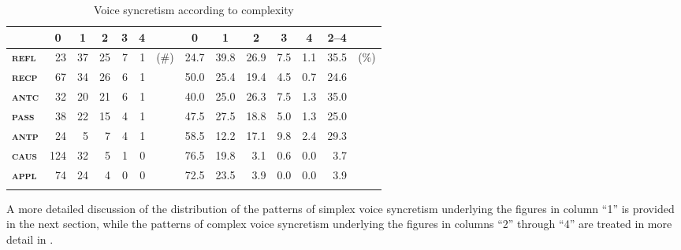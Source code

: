 \begin{table}
	\setlength{\tabcolsep}{2.7pt}
	\begin{tabularx}{.77\textwidth}{lrrrrrlrrrrrrl}
		\lsptoprule
		& \multicolumn{1}{c}{\textbf{0}} & \multicolumn{1}{c}{\textbf{1}} & \multicolumn{1}{c}{\textbf{2}} & \multicolumn{1}{c}{\textbf{3}} & \multicolumn{1}{c}{\textbf{4}} & & \multicolumn{1}{c}{\textbf{0}} & \multicolumn{1}{c}{\textbf{1}} & \multicolumn{1}{c}{\textbf{2}} & \multicolumn{1}{c}{\textbf{3}} & \multicolumn{1}{c}{\textbf{4}} & \multicolumn{1}{c}{\textbf{2--4}} & \\
		\midrule
		\textbf{\textsc{refl}} & 23 & 37 & 25 & 7 & 1 & (\#) & 24.7 & 39.8 & 26.9 & 7.5 & 1.1 & 35.5 & (\%) \\
		\textbf{\textsc{recp}} & 67 & 34 & 26 & 6 & 1 & & 50.0 & 25.4 & 19.4 & 4.5 & 0.7 & 24.6 & \\
		\textbf{\textsc{antc}} & 32 & 20 & 21 & 6 & 1 & & 40.0 & 25.0 & 26.3 & 7.5 & 1.3 & 35.0 & \\
		\textbf{\textsc{pass}} & 38 & 22 & 15 & 4 & 1 & & 47.5 & 27.5 & 18.8 & 5.0 & 1.3 & 25.0 & \\
		\textbf{\textsc{antp}} & 24 & 5 & 7 & 4 & 1 & & 58.5 & 12.2 & 17.1 & 9.8 & 2.4 & 29.3 & \\
		\textbf{\textsc{caus}} & 124 & 32 & 5 & 1 & 0 & & 76.5 & 19.8 & 3.1 & 0.6 & 0.0 & 3.7 & \\
		\textbf{\textsc{appl}} & 74 & 24 & 4 & 0 & 0 & & 72.5 & 23.5 & 3.9 & 0.0 & 0.0 & 3.9 & \\
		\lspbottomrule
	\end{tabularx}
	\caption{Voice syncretism according to complexity}
	\label{tab:ch6:voice-syncretism-complexity}
\end{table} 

A more detailed discussion of the distribution of the patterns of simplex voice syncretism underlying the figures in column “1” is provided in the next section, while the patterns of complex voice syncretism underlying the figures in columns “2” through “4” are treated in more detail in .

